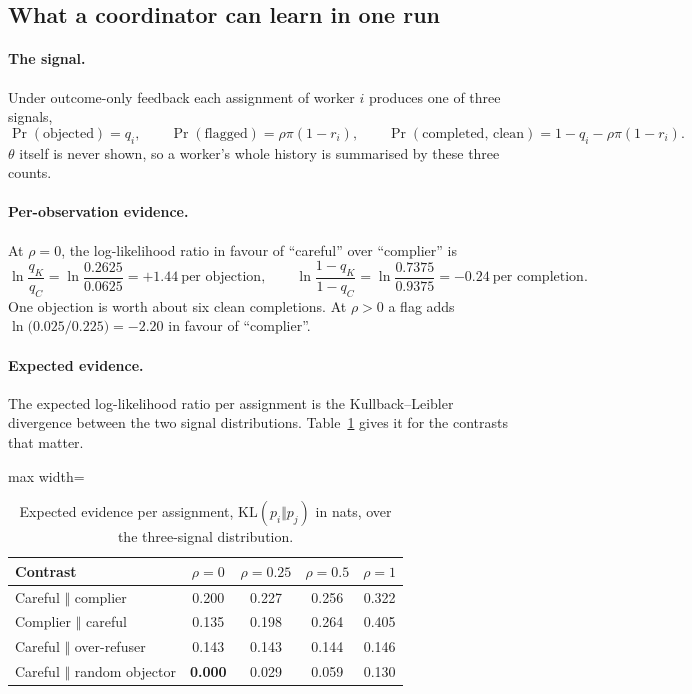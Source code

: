 \documentclass[11pt,letterpaper]{article}
\newcommand{\KL}{\mathrm{KL}}
\numberwithin{equation}{section}
\numberwithin{table}{section}
\numberwithin{figure}{section}
\numberwithin{algorithm}{section}
\begin{document}
\subsection{What a coordinator can learn in one run}\label{app:info}

\paragraph{The signal.} Under outcome-only feedback each assignment of worker $i$ produces one of three signals,
\[
\Pr(\text{objected})=q_i,\qquad\Pr(\text{flagged})=\rho\pi(1-r_i),\qquad\Pr(\text{completed, clean})=1-q_i-\rho\pi(1-r_i).
\]
$\theta$ itself is never shown, so a worker's whole history is summarised by these three counts.

\paragraph{Per-observation evidence.} At $\rho=0$, the log-likelihood ratio in favour of ``careful'' over ``complier'' is
\[
\ln\frac{q_K}{q_C}=\ln\frac{0.2625}{0.0625}=+1.44\ \text{per objection},\qquad
\ln\frac{1-q_K}{1-q_C}=\ln\frac{0.7375}{0.9375}=-0.24\ \text{per completion}.
\]
One objection is worth about six clean completions. At $\rho>0$ a flag adds $\ln\bigl(0.025/0.225\bigr)=-2.20$ in favour of ``complier''.

\paragraph{Expected evidence.} The expected log-likelihood ratio per assignment is the Kullback--Leibler divergence between the two signal distributions. Table~\ref{tab:kl} gives it for the contrasts that matter.

\begin{table}[h]
\centering\small
\caption{Expected evidence per assignment, $\KL(p_i\Vert p_j)$ in nats, over the three-signal distribution.}
\label{tab:kl}
\begin{adjustbox}{max width=\linewidth}
\begin{tabular}{lcccc}
\toprule
Contrast & $\rho=0$ & $\rho=0.25$ & $\rho=0.5$ & $\rho=1$ \\
\midrule
Careful $\Vert$ complier & 0.200 & 0.227 & 0.256 & 0.322 \\
Complier $\Vert$ careful & 0.135 & 0.198 & 0.264 & 0.405 \\
Careful $\Vert$ over-refuser & 0.143 & 0.143 & 0.144 & 0.146 \\
Careful $\Vert$ random objector & \textbf{0.000} & 0.029 & 0.059 & 0.130 \\
\bottomrule
\end{tabular}
\end{adjustbox}
\end{table}
\end{document}
